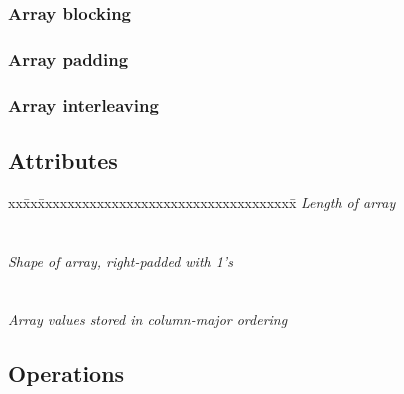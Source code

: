 \subsubsection{Array blocking}

\subsubsection{Array padding}

\subsubsection{Array interleaving}


\subsection{Attributes}

\begin{tabbing}
xx\=xx\=xxxxxxxxxxxxxxxxxxxxxxxxxxxxxxxxxxx\= \kill
\> \todo \>  \textit{Length of array} \\
\>       \>       \\ \\
\> \todo \>  \textit {Shape of array, right-padded with 1's} \\
\>       \>   \\ \\
\> \todo \>  \textit {Array values stored in column-major ordering}\\
\>       \> 
\end{tabbing}

\subsection{Operations}

